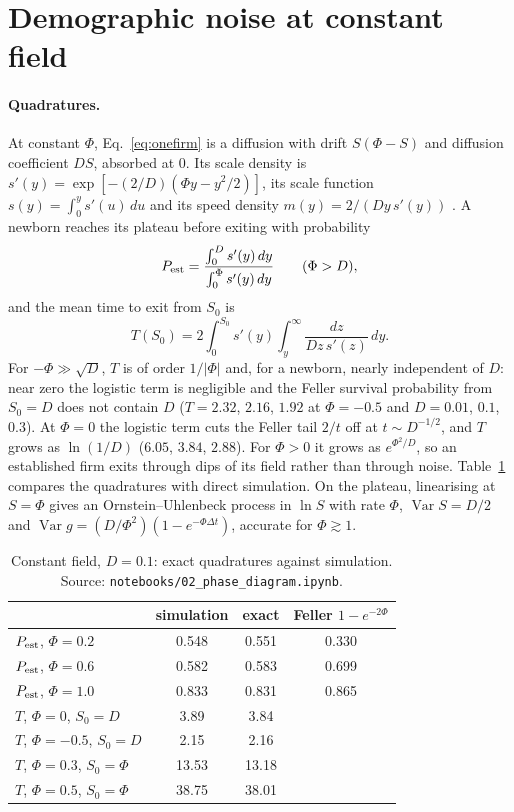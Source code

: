 \documentclass[pre,twocolumn,superscriptaddress,nofootinbib]{revtex4-2}
\newcommand{\Var}{\operatorname{Var}}
\begin{document}
\section{Demographic noise at constant field}
\label{app:constant}

\paragraph{Quadratures.}  At constant $\Phi$, Eq.~\eqref{eq:onefirm} is a diffusion with drift $S(\Phi-S)$ and diffusion
coefficient $DS$, absorbed at $0$.  Its scale density is $s'(y)=\exp[-(2/D)(\Phi y-y^2/2)]$, its scale function
$s(y)=\int_0^ys'(u)\,du$ and its speed density $m(y)=2/(Dy\,s'(y))$ \cite{karlintaylor1981}.  A newborn reaches its plateau before exiting with
probability
\begin{equation}
P_{\rm est}=\frac{\int_0^Ds'(y)\,dy}{\int_0^\Phi s'(y)\,dy}\qquad(\Phi>D),
\end{equation}
and the mean time to exit from $S_0$ is
\begin{equation}
T(S_0)=2\int_0^{S_0}s'(y)\int_y^\infty\frac{dz}{Dz\,s'(z)}\,dy .
\end{equation}
For $-\Phi\gg\sqrt D$, $T$ is of order $1/|\Phi|$ and, for a newborn, nearly independent of $D$: near zero the
logistic term is negligible and the Feller survival probability from $S_0=D$ does not contain $D$ ($T=2.32$,
$2.16$, $1.92$ at $\Phi=-0.5$ and $D=0.01$, $0.1$, $0.3$).  At $\Phi=0$ the logistic term cuts the Feller tail
$2/t$ off at $t\sim D^{-1/2}$, and $T$ grows as $\ln(1/D)$ ($6.05$, $3.84$, $2.88$).  For
$\Phi>0$ it grows as $e^{\Phi^2/D}$, so an established firm exits through dips of its field rather than
through noise.  Table~\ref{tab:constant} compares the quadratures with direct simulation.  On the
plateau, linearising at $S=\Phi$ gives an Ornstein--Uhlenbeck process in $\ln S$ with rate $\Phi$, $\Var
S=D/2$ and $\Var g=(D/\Phi^2)(1-e^{-\Phi\Delta t})$, accurate for $\Phi\gtrsim1$.

\begin{table}[t]
\caption{Constant field, $D=0.1$: exact quadratures against simulation.  Source:
\texttt{notebooks/02\_phase\_diagram.ipynb}.}
\label{tab:constant}
\begin{ruledtabular}
\begin{tabular}{lccc}
 & simulation & exact & Feller $1-e^{-2\Phi}$\\
\hline
$P_{\rm est}$, $\Phi=0.2$ & 0.548 & 0.551 & 0.330\\
$P_{\rm est}$, $\Phi=0.6$ & 0.582 & 0.583 & 0.699\\
$P_{\rm est}$, $\Phi=1.0$ & 0.833 & 0.831 & 0.865\\
$T$, $\Phi=0$, $S_0=D$ & 3.89 & 3.84 & \\
$T$, $\Phi=-0.5$, $S_0=D$ & 2.15 & 2.16 & \\
$T$, $\Phi=0.3$, $S_0=\Phi$ & 13.53 & 13.18 & \\
$T$, $\Phi=0.5$, $S_0=\Phi$ & 38.75 & 38.01 & \\
\end{tabular}
\end{ruledtabular}
\end{table}
\end{document}
